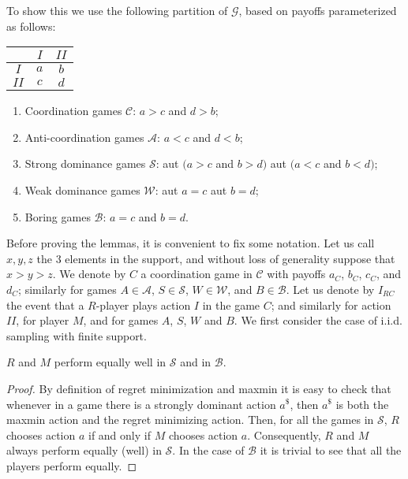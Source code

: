 \documentclass[fleqn,reqno,11pt]{article}
\begin{document}
\noindent To show this we use the following partition of $\mathcal{G}$, based on payoffs parameterized as
follows:
\begin{center}
  \begin{tabular}{ccc}
    \toprule
    & $I$ & $II$ \\ \midrule
    $I$ & $a$ & $b$ \\
    $II$ & $c$ & $d$ \\ \bottomrule
  \end{tabular}
\end{center}
\begin{enumerate}
\item Coordination games $\mathcal{C}$: $a>c$ and $d>b$;
\item Anti-coordination games $\mathcal{A}$: $a<c$ and $d<b$;
\item Strong dominance games $\mathcal{S}$: aut $(a>c$ and $b>d)$
aut $(a<c$ and $b<d)$;
\item Weak dominance games $\mathcal{W}$: aut $a=c$ aut $b=d$;
\item Boring games $\mathcal{B}$: $a=c$ and $b=d$.
\end{enumerate}
Before proving the lemmas, it is convenient to fix some notation. Let us call $x,y,z$ the 3
elements in the support, and without loss of generality suppose that $ x > y > z $.  We denote
by $C$ a coordination game in $\mathcal{C}$ with payoffs $a_{C}$, $b_{C}$, $c_{C}$, and
$d_{C}$; similarly for games $A \in \mathcal{A}$, $S \in \mathcal{S}$, $W \in \mathcal{W}$, and
$B \in \mathcal{B}$.  Let us denote by $I_{RC}$ the event that a $R$-player plays action $I$ in
the game $C$; and similarly for action $II$, for player $M$, and for games $A$, $S$, $W$ and
$B$. We first consider the case of i.i.d. sampling with finite support.

\begin{lemma} \label{lemma:S-B games} $R$ and $M$ perform equally well in $\mathcal{S}$ and in
  $\mathcal{B}$.
\end{lemma}

\begin{proof}
  By definition of regret minimization and maxmin it is easy to check that whenever in a game
  there is a strongly dominant action $a^{\$}$, then $a^{\$}$ is both the maxmin action and the
  regret minimizing action. Then, for all the games in $\mathcal{S}$, $R$ chooses action $a$ if
  and only if $M$ chooses action $a$. Consequently, $R$ and $M$ always perform equally (well)
  in $\mathcal{S}$. In the case of $\mathcal{B}$ it is trivial to see that all the players
  perform equally.
\end{proof}
\end{document}
